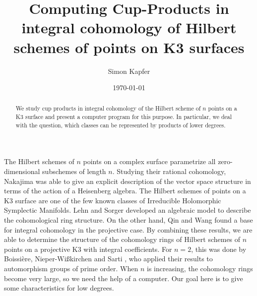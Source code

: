 \documentclass{amsart}
\DeclareMathOperator{\Hilb}{Hilb}
\newcommand{\IZ}{\mathbb{Z}}
\theoremstyle{plain}
\theoremstyle{definition}
\theoremstyle{remark}
\begin{document}
\title[Products in $H^\ast(\Hilb^n(K3), \IZ)$]{Computing Cup-Products in integral cohomology of Hilbert schemes of points on K3 surfaces}


\author{Simon Kapfer}
\address{Simon Kapfer, Lehrstuhl f\"ur Algebra und Zahlentheorie, Universit\"ats\-stra{\ss}e~14, D-86159 Augsburg}


\date{\today}



\begin{abstract} 

We study cup 
products in integral cohomology of the Hilbert scheme of $n$ points on a K3 surface and present a computer program for this purpose. In particular, we deal with the question, which classes can be represented by products of lower degrees.
\end{abstract}

\maketitle


The Hilbert schemes of $n$ points on a complex surface parametrize all zero-dimensional subschemes of length $n$. Studying their rational cohomology, Nakajima \cite{Nakajima} was able to give an explicit description of the vector space structure in terms of the action of a Heisenberg algebra.
The Hilbert schemes of points on a K3 surface are one of the few known classes of Irreducible Holomorphic Symplectic Manifolds. Lehn and Sorger \cite{LehnSorger} developed an algebraic model to describe the cohomological ring structure. On the other hand, Qin and Wang \cite{QinWang} found a base for integral cohomology in the projective case. By combining these results, we are able to determine the structure of the cohomology rings of Hilbert schemes of $n$ points on a projective K3 with integral coefficients. 
For $n=2$, this was done by Boissi\`ere, Nieper-Wi{\ss}kirchen and Sarti \cite{BNS}, who applied their results to automorphism groups of prime order. When $n$ is increasing, the cohomology rings become very large, so we need the help of a computer. Our goal here is to give some characteristics for low degrees.
\end{document}
